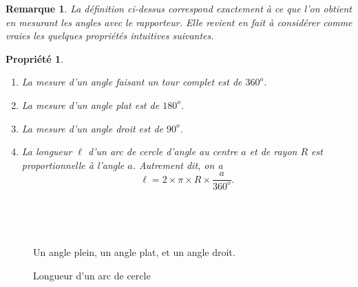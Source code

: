 \documentclass[12 pt]{article}
\theoremstyle{plain}
\newcounter{n}
\numberwithin{n}{section}
\newtheorem*{prop}{Propriété}
\newtheorem*{rmq}{Remarque}
\begin{document}
\begin{rmq}
La définition ci-dessus correspond exactement à ce que l'on obtient en mesurant les angles avec le 
rapporteur. Elle revient en fait à considérer comme vraies les quelques propriétés intuitives suivantes. 
\end{rmq}
\begin{prop}
\begin{enumerate}
\item La mesure d'un angle faisant un tour complet est de $360^o$.
\item La mesure d'un angle plat est de $180^o$.
\item La mesure d'un angle droit est de $90^o$.
\item La longueur $\ell$ d'un arc de cercle d'angle au centre $a$ et de rayon $R$ est proportionnelle à l'angle $a$. Autrement dit, on a \[\ell = 2 \times \pi \times R
\times \frac{a}{360^o}. \]
\end{enumerate}
\end{prop}
\begin{figure}[H]\center
{}\ \ \ \ \ \ \ \ \ \ \ \ 
\ \ \ \ \ \ \ \ \ \ \ \ \ 
\caption{Un angle plein, un angle plat, et un angle droit.}
\end{figure}
\begin{figure}[H]\center
{}
\caption{Longueur d'un arc de cercle}
\end{figure}
\end{document}
